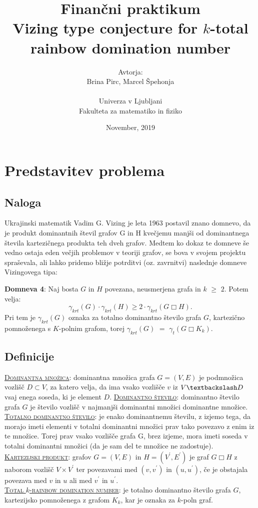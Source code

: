 \documentclass[12pt, a4paper]{article}
\title{ Finančni praktikum \\\vspace{3cm} {\huge \textbf{Vizing type conjecture for $k$-total rainbow domination number}}\vspace{8mm}}
\author{Avtorja: \\[1.5mm] Brina Pirc, Marcel Špehonja \\ \vspace{6cm}
\\ Univerza v Ljubljani \\[1.5mm]
Fakulteta za matematiko in fiziko \vspace{2cm}}
\date{November, 2019}
\begin{document}
\begin{titlepage}
\clearpage \maketitle
\thispagestyle{empty}
\end{titlepage}

\hypersetup{hidelinks}
\thispagestyle{empty}
\hypersetup{linkcolor = black}
\tableofcontents
\pagebreak


\section{Predstavitev problema}
\subsection{Naloga}
Ukrajinski matematik Vadim G. Vizing je leta 1963 postavil znano domnevo, da je produkt dominantnih števil grafov G in H kvečjemu manjši od dominantnega števila kartezičnega produkta teh dveh grafov. Medtem ko dokaz te domneve še vedno ostaja eden večjih problemov v teoriji grafov, se bova v svojem projektu spraševala, ali lahko pridemo bližje potrditvi (oz. zavrnitvi) naslednje domneve Vizingovega tipa: 

\textbf{Domneva 4}:  Naj bosta $G$ in $H$ povezana, neusmerjena grafa in $k$ $\geq$ $2$. Potem velja: $$\gamma_{krt}(G) \cdot \gamma_{krt}(H) \geq 2 \cdot \gamma_{krt}(G \Box H).$$
Pri tem je $\gamma_{krt}(G)$ oznaka za totalno dominantno število grafa $G$, kartezično pomnoženega s $K$-polnim grafom, torej $\gamma_{krt}(G)$ $=$ $\gamma_{t}(G \Box K_k)$.

\subsection{Definicije}

\underline{\textsc{Dominantna množica}}: dominantna množica grafa $G = (V,E)$ je podmnožica vozlišč $D \subset V$, za katero velja, da ima vsako vozlišče $v$ iz $V \textbackslash D$ vsaj enega soseda, ki je element $D$.
\underline{\textsc{Dominantno število}}: dominantno število grafa $G$ je število vozlišč v najmanjši dominantni množici dominantne množice. \\
\underline{\textsc{Totalno dominantno število}}: je enako dominantnemu številu, z izjemo tega, da morajo imeti elementi v totalni dominantni množici prav tako povezavo z enim iz te množice. Torej prav vsako vozlišče grafa G, brez izjeme, mora imeti soseda v totalni dominantni množici (da je sam del te množice ne zadostuje). \\
\underline{\textsc{Kartezijski produkt}}: grafov $G = (V, E)$ in $H = (V^{\prime}, E^{\prime})$ je graf $G \Box H$ z naborom vozlišč $V \times V^{\prime}$ ter povezavami med $(v, v^{\prime})$ in $(u, u^{\prime})$, če je obstajala povezava med $v$ in $u$ ali med $v^{\prime}$ in $u^{\prime}$. \\
\underline{\textsc{Total $k$-rainbow domination number}}: je totalno dominantno število grafa $G$, kartezijsko pomnoženega z grafom $K_k$, kar je oznaka za $k$-poln graf. \\
\end{document}
